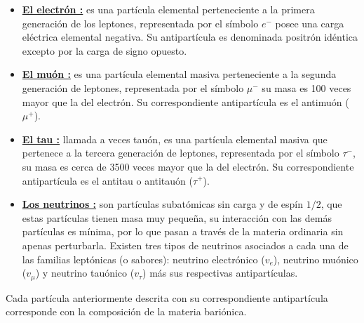 \begin{itemize}
    \item \href{https://es.wikipedia.org/wiki/Electr\%C3\%B3n}{\textbf{El electrón :}} es una partícula elemental perteneciente a la primera generación de los leptones, representada por el símbolo $e^-$ posee una carga eléctrica elemental negativa. Su antipartícula es denominada positrón idéntica excepto por la carga de signo opuesto.
    
    \item \href{https://es.wikipedia.org/wiki/Muon}{\textbf{El muón :}} 
     es una partícula elemental masiva perteneciente a la segunda generación de leptones, representada por el símbolo $\mu^-$ su masa es 100 veces mayor que la del electrón. Su correspondiente antipartícula es el antimuón ($\mu^+$).
    
    \item \href{https://es.wikipedia.org/wiki/Tau_(part\%C3\%ADcula)}{\textbf{El tau :}} llamada a veces tauón, es una partícula elemental masiva que pertenece a la tercera generación de leptones, representada por el símbolo $\tau^-$, su masa es cerca de 3500 veces mayor que la del electrón. Su correspondiente antipartícula es el antitau o antitauón ($\tau^+$).
    
    \item \href{https://es.wikipedia.org/wiki/Neutrino}{\textbf{Los neutrinos :}}
    son partículas subatómicas sin carga y de espín $1/2$, que estas partículas tienen masa muy pequeña, su interacción con las demás partículas es mínima, por lo que pasan a través de la materia ordinaria sin apenas perturbarla. Existen tres tipos de neutrinos asociados a cada una de las familias leptónicas (o sabores): neutrino electrónico ($v_e$), neutrino muónico ($v_\mu$) y neutrino tauónico ($v_\tau$) más sus respectivas antipartículas.

\end{itemize}

Cada partícula anteriormente descrita con su correspondiente antipartícula corresponde con la composición de la materia bariónica.
